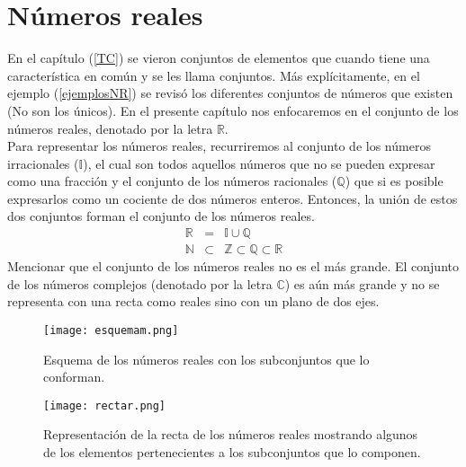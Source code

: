 \chapter{Números reales}
\label{nr}


En el capítulo (\ref{TC}) se vieron conjuntos de elementos que cuando tiene una característica en común y se les llama conjuntos. Más explícitamente, en el ejemplo (\ref{ejemplosNR}) se revisó los diferentes conjuntos de números que existen (No son los únicos). En el presente capítulo nos enfocaremos en el conjunto de los números reales, denotado por la letra $\mathbb{R}$.\\
Para representar los números reales, recurriremos al conjunto de los números irracionales ($\mathbb{I}$), el cual son todos aquellos números que no se pueden expresar como una fracción y el conjunto de los números racionales ($\mathbb{Q}$) que si es posible expresarlos como un cociente de dos números enteros. Entonces, la unión de estos dos conjuntos forman el conjunto de los números reales.
\begin{eqnarray*}
\mathbb{R}&=&\mathbb{I}\cup \mathbb{Q} \nonumber\\
\mathbb{N}&\subset & \mathbb{Z }\subset \mathbb{Q}\subset \mathbb{R}\nonumber
\end{eqnarray*}
Mencionar que el conjunto de los números reales no es el más grande. El conjunto de los números complejos (denotado por la letra $\mathbb{C}$) es aún más grande y no se representa con una recta como reales sino con un plano de dos ejes.\\ 
\begin{figure}
	\centering
	\texttt{[image: esquemam.png]}
	\caption[Esquema de los números reales]{Esquema de los números reales con los subconjuntos que lo conforman. }
\end{figure}
\begin{figure}
	\centering
	\texttt{[image: rectar.png]}
	\caption[Representación de la recta de los números reales]{Representación de la recta de los números reales mostrando algunos de los elementos pertenecientes a los subconjuntos que lo componen.}
	\label{rectar}
\end{figure}

